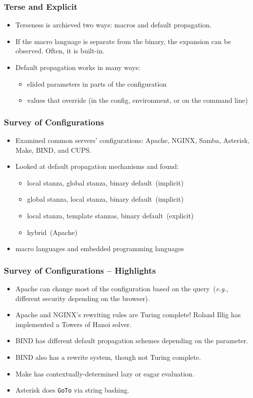 \documentclass{beamer}
\begin{document}
\begin{frame}\frametitle{Terse and Explicit}
\begin{itemize}
\item Terseness is archieved two ways: macros and default propagation.
\item If the macro language is separate from the binary, the expansion can be observed. Often, it is built-in.
\item Default propagation works in many ways:
\begin{itemize}
\item elided parameters in parts of the configuration
\item values that override (in the config, environment, or on the command line)
\end{itemize}
\end{itemize}
\end{frame}

\begin{frame}\frametitle{Survey of Configurations}
\begin{itemize}
\item Examined common servers' configurations: Apache, NGINX, Samba, Asterisk, Make, BIND, and CUPS.
\item Looked at default propagation mechanisms and found:
\begin{itemize}
\item local stanza, global stanza, binary default~(implicit)
\item global stanza, local stanza, binary default~(implicit)
\item local stanza, template stanzas, binary default~(explicit)
\item hybrid~(Apache)
\end{itemize}
\item macro languages and embedded programming languages
\end{itemize}
\end{frame}

\begin{frame}\frametitle{Survey of Configurations -- Highlights}
\begin{itemize}
\item Apache can change most of the configuration based on the query~(\emph{e.g.}, different security depending on the browser).
\item Apache and NGINX's rewriting rules are Turing complete! Roland Illig has implemented a Towers of Hanoi solver.
\item BIND has different default propagation schemes depending on the parameter.
\item BIND also has a rewrite system, though not Turing complete.
\item Make has contextually-determined lazy or eagar evaluation.
\item Asterisk does \texttt{GoTo} via string bashing.
\end{itemize}
\end{frame}
\end{document}
